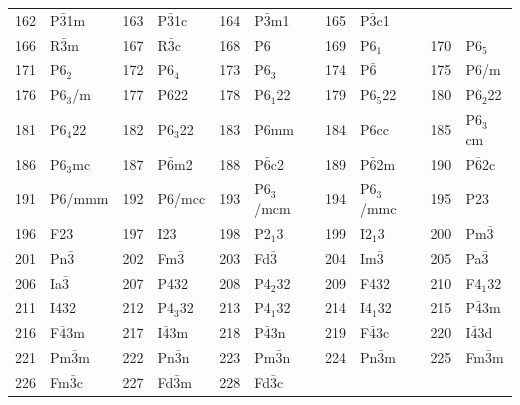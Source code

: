 \documentclass[final,12pt]{article}
\begin{document}
{{{{{{\begin{table}[!h]
\begin{center}
\begin{tabular}{||r|l||r|l||r|l||r|l||r|l||}
162    & P$\bar{3}$1m       & 
163    & P$\bar{3}$1c       & 
164    & P$\bar{3}$m1       & 
165    & P$\bar{3}$c1       \\
166    & R$\bar{3}$m        & 
167    & R$\bar{3}$c        & 
168    & P6                 & 
169    & P6$_1$             & 
170    & P6$_5$             \\
171    & P6$_2$             & 
172    & P6$_4$             & 
173    & P6$_3$             & 
174    & P$\bar{6}$                & 
175    & P6/m               \\
176    & P6$_3$/m           & 
177    & P622               & 
178    & P6$_1$22           & 
179    & P6$_5$22           & 
180    & P6$_2$22           \\
181    & P6$_4$22           & 
182    & P6$_3$22           & 
183    & P6mm               & 
184    & P6cc               & 
185    & P6$_3$cm           \\
186    & P6$_3$mc           & 
187    & P$\bar{6}$m2       & 
188    & P$\bar{6}$c2       & 
189    & P$\bar{6}$2m       & 
190    & P$\bar{6}$2c       \\
191    & P6/mmm             & 
192    & P6/mcc             & 
193    & P6$_3$/mcm         & 
194    & P6$_3$/mmc         & 
195    & P23                \\
196    & F23                & 
197    & I23                & 
198    & P2$_1$3            & 
199    & I2$_1$3            & 
200    & Pm$\bar{3}$        \\
201    & Pn$\bar{3}$        & 
202    & Fm$\bar{3}$        & 
203    & Fd$\bar{3}$        & 
204    & Im$\bar{3}$        & 
205    & Pa$\bar{3}$        \\
206    & Ia$\bar{3}$        & 
207    & P432               & 
208    & P4$_2$32           & 
209    & F432               & 
210    & F4$_1$32           \\
211    & I432               & 
212    & P4$_3$32           & 
213    & P4$_1$32           & 
214    & I4$_1$32           & 
215    & P$\bar{4}$3m       \\
216    & F$\bar{4}$3m       & 
217    & I$\bar{4}$3m       & 
218    & P$\bar{4}$3n       & 
219    & F$\bar{4}$3c       & 
220    & I$\bar{4}$3d       \\
221    & Pm$\bar{3}$m       & 
222    & Pn$\bar{3}$n       & 
223    & Pm$\bar{3}$n       & 
224    & Pn$\bar{3}$m       & 
225    & Fm$\bar{3}$m       \\
226    & Fm$\bar{3}$c       & 
227    & Fd$\bar{3}$m       & 
228    & Fd$\bar{3}$c       & 

\end{tabular}
\end{center}
\end{table}}}}}}}
\end{document}
